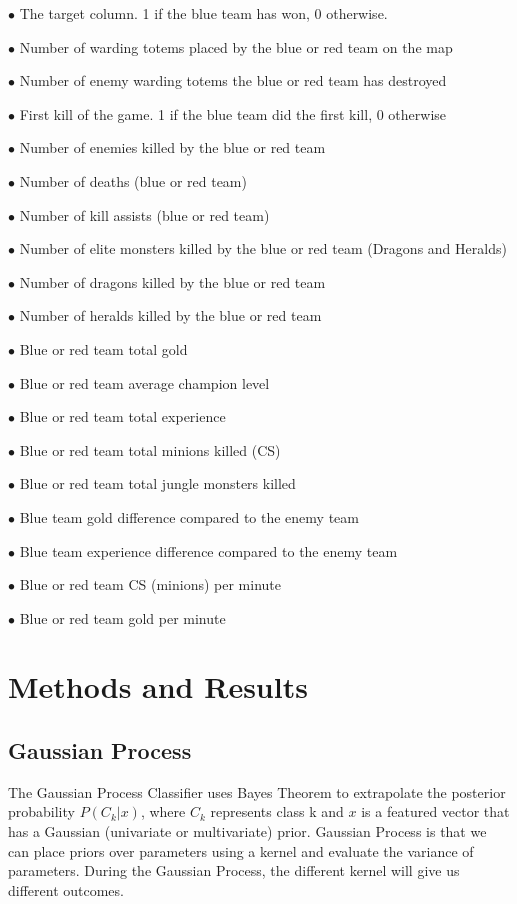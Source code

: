 \documentclass{article}
\begin{document}
$\bullet$ The target column. 1 if the blue team has won, 0 otherwise.

$\bullet$ Number of warding totems placed by the blue or red team on the map

$\bullet$ Number of enemy warding totems the blue or red team has destroyed

$\bullet$ First kill of the game. 1 if the blue team did the first kill, 0 otherwise

$\bullet$ Number of enemies killed by the blue or red team

$\bullet$ Number of deaths (blue or red team)

$\bullet$ Number of kill assists (blue or red team)

$\bullet$ Number of elite monsters killed by the blue or red team (Dragons and Heralds)

$\bullet$ Number of dragons killed by the blue or red team

$\bullet$ Number of heralds killed by the blue or red team

$\bullet$ Blue or red team total gold

$\bullet$ Blue or red team average champion level

$\bullet$ Blue or red team total experience

$\bullet$ Blue or red team total minions killed (CS)

$\bullet$ Blue or red team total jungle monsters killed

$\bullet$ Blue team gold difference compared to the enemy team

$\bullet$ Blue team experience difference compared to the enemy team

$\bullet$ Blue or red team CS (minions) per minute

$\bullet$ Blue or red team gold per minute

\section{Methods and Results}

\subsection{Gaussian Process}
The Gaussian Process Classifier uses Bayes Theorem to extrapolate the posterior probability $P(C_{k}|x)$, where $C_{k}$ represents class k and $x$ is a featured vector that has a Gaussian (univariate or multivariate) prior. Gaussian Process is that we can place priors over parameters using a kernel and evaluate the variance of parameters. During the Gaussian Process, the different kernel will give us different outcomes.
\end{document}
